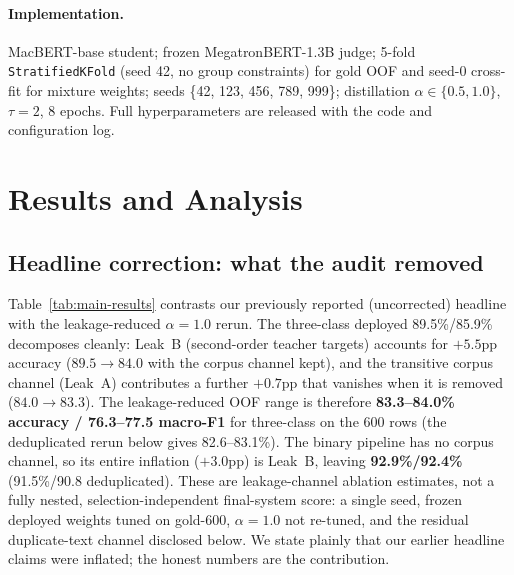 \paragraph{Implementation.} MacBERT-base student; frozen MegatronBERT-1.3B
judge; 5-fold \texttt{StratifiedKFold} (seed 42, no group constraints)
for gold OOF and seed-0
cross-fit for mixture weights; seeds \{42, 123, 456, 789, 999\}; distillation
$\alpha\in\{0.5,1.0\}$, $\tau{=}2$, 8 epochs. Full hyperparameters are
released with the code and configuration log.

\section{Results and Analysis}
\label{sec:results}

\subsection{Headline correction: what the audit removed}
\label{sec:res-correction}

Table~\ref{tab:main-results} contrasts our previously reported (uncorrected)
headline with the leakage-reduced $\alpha{=}1.0$ rerun. The three-class deployed
89.5\%/85.9\% decomposes cleanly: Leak~B (second-order teacher targets)
accounts for $+5.5$pp accuracy ($89.5\to84.0$ with the corpus channel kept),
and the transitive corpus channel (Leak~A) contributes a further
$+0.7$pp that vanishes when it is removed ($84.0\to83.3$). The
leakage-reduced OOF range is therefore
\textbf{83.3--84.0\% accuracy / 76.3--77.5 macro-F1} for three-class on
the 600 rows (the deduplicated rerun below gives 82.6--83.1\%). The
binary pipeline has no corpus channel, so its entire inflation ($+3.0$pp)
is Leak~B, leaving \textbf{92.9\%/92.4\%} (91.5\%/90.8 deduplicated).
These are leakage-channel ablation estimates, not a fully nested,
selection-independent final-system score: a single seed, frozen
deployed weights tuned on gold-600, $\alpha{=}1.0$ not re-tuned, and
the residual duplicate-text channel disclosed below.
We state plainly that our earlier headline claims were inflated; the
honest numbers are the contribution.

